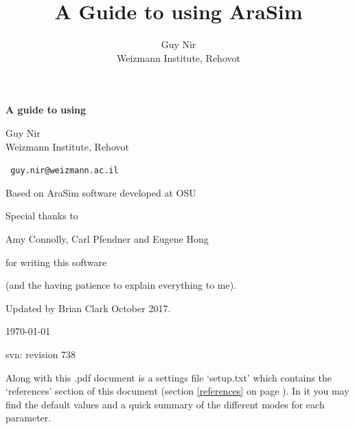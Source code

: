 \documentclass[a4paper,10pt]{article}
\newcommand{\room}{\vspace{0.3cm}}
\newcommand{\arasim}{AraSim\xspace}
\begin{document}
 



\begin{centering}

\title{A Guide to using AraSim}

\noindent\huge \textbf{A guide to using  }

\normalsize
\room

\author{Guy Nir \\ \small Weizmann Institute, Rehovot}

\Large Guy Nir \\ \small Weizmann Institute, Rehovot

\vspace{0.3cm}

\verb| guy.nir@weizmann.ac.il |

\vspace{1cm}

Based on \arasim software developed at OSU

Special thanks to 

Amy Connolly, Carl Pfendner and Eugene Hong 

for writing this software 

(and the having patience to explain everything to me). 

Updated by Brian Clark October 2017.

\room

\today

svn: revision 738

\end{centering}

\vspace{3cm}


Along with this .pdf document is a settings file `setup.txt' which contains the `references' section of this document (section \ref{references} on page \pageref{references}). In it you may find the default values and a quick summary of the different modes for each parameter. 
\end{document}
